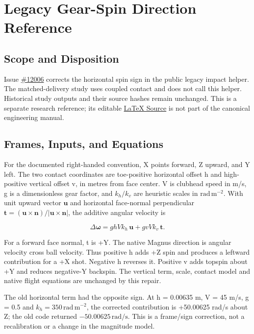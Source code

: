 \documentclass[
]{article}
\author{}
\date{}
\begin{document}
\section{Legacy Gear-Spin Direction
Reference}\label{legacy-gear-spin-direction-reference}

\subsection{Scope and Disposition}\label{scope-and-disposition}

Issue
\href{https://github.com/D-sorganization/UpstreamDrift/issues/12006}{\#12006}
corrects the horizontal spin sign in the public legacy impact helper.
The matched-delivery study uses coupled contact and does not call this
helper. Historical study outputs and their source hashes remain
unchanged. This is a separate research reference; its editable
\href{LEGACY_GEAR_SIGN_REFERENCE.tex}{LaTeX Source} is not part of the
canonical engineering manual.

\subsection{Frames, Inputs, and
Equations}\label{frames-inputs-and-equations}

For the documented right-handed convention, X points forward, Z upward,
and Y left. The two contact coordinates are toe-positive horizontal
offset h and high-positive vertical offset v, in metres from face
center. V is clubhead speed in m/s, g is a dimensionless gear factor,
and \(k_h/k_v\) are heuristic scales in \(\mathrm{rad\,m^{-2}}\). With
unit upward vector \(\mathbf u\) and horizontal face-normal
perpendicular
\(\mathbf t = (\mathbf u \times \mathbf n)/|\mathbf u \times \mathbf n|\),
the additive angular velocity is

\[\Delta\boldsymbol\omega = g h V k_h\,\mathbf u + g v V k_v\,\mathbf t.\]

For a forward face normal, t is +Y. The native Magnus direction is
angular velocity cross ball velocity. Thus positive h adds +Z spin and
produces a leftward contribution for a +X shot. Negative h reverses it.
Positive v adds topspin about +Y and reduces negative-Y backspin. The
vertical term, scale, contact model and native flight equations are
unchanged by this repair.

The old horizontal term had the opposite sign. At h = 0.00635 m, V = 45
m/s, g = 0.5 and \(k_h = 350\,\mathrm{rad\,m^{-2}}\), the corrected
contribution is +50.00625 rad/s about Z; the old code returned
\(-50.00625\,\mathrm{rad/s}\). This is a frame/sign correction, not a
recalibration or a change in the magnitude model.
\end{document}
